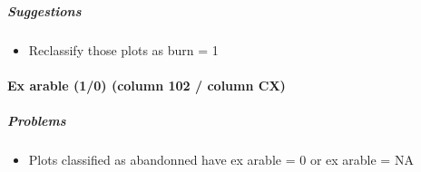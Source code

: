 \documentclass[table]{article}
\providecommand{\tightlist}{%
  \setlength{\itemsep}{0pt}\setlength{\parskip}{0pt}}
\let\oldparagraph\paragraph
\renewcommand{\paragraph}[1]{\oldparagraph{#1}\mbox{}}
\let\oldsubparagraph\subparagraph
\renewcommand{\subparagraph}[1]{\oldsubparagraph{#1}\mbox{}}
\begin{document}
\subparagraph{\texorpdfstring{\emph{Suggestions}}{Suggestions}}\label{suggestions-6}

\begin{itemize}
\tightlist
\item
  Reclassify those plots as burn = 1
\end{itemize}

\paragraph{Ex arable (1/0) (column 102 / column
CX)}\label{ex-arable-10-column-102-column-cx}

\subparagraph{\texorpdfstring{\emph{Problems}}{Problems}}\label{problems-7}

\begin{itemize}
\tightlist
\item
  Plots classified as abandonned have ex arable = 0 or ex arable = NA
\end{itemize}
\end{document}
